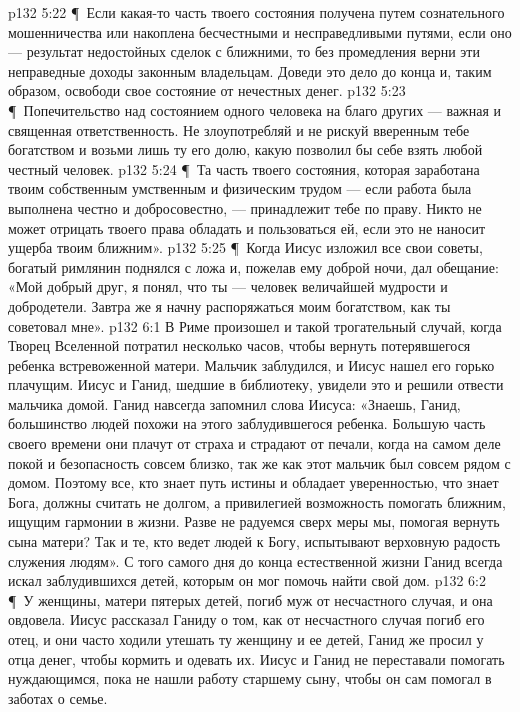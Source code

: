 \vs p132 5:22 \P\ \bibnobreakspace Если какая\hyp{}то часть твоего состояния получена путем сознательного мошенничества или накоплена бесчестными и несправедливыми путями, если оно --- результат недостойных сделок с ближними, то без промедления верни эти неправедные доходы законным владельцам. Доведи это дело до конца и, таким образом, освободи свое состояние от нечестных денег.
\vs p132 5:23 \P\ \bibnobreakspace Попечительство над состоянием одного человека на благо других --- важная и священная ответственность. Не злоупотребляй и не рискуй вверенным тебе богатством и возьми лишь ту его долю, какую позволил бы себе взять любой честный человек.
\vs p132 5:24 \P\ \bibnobreakspace Та часть твоего состояния, которая заработана твоим собственным умственным и физическим трудом --- если работа была выполнена честно и добросовестно, --- принадлежит тебе по праву. Никто не может отрицать твоего права обладать и пользоваться ей, если это не наносит ущерба твоим ближним».
\vs p132 5:25 \P\ Когда Иисус изложил все свои советы, богатый римлянин поднялся с ложа и, пожелав ему доброй ночи, дал обещание: «Мой добрый друг, я понял, что ты --- человек величайшей мудрости и добродетели. Завтра же я начну распоряжаться моим богатством, как ты советовал мне».
\vs p132 6:1 В Риме произошел и такой трогательный случай, когда Творец Вселенной потратил несколько часов, чтобы вернуть потерявшегося ребенка встревоженной матери. Мальчик заблудился, и Иисус нашел его горько плачущим. Иисус и Ганид, шедшие в библиотеку, увидели это и решили отвести мальчика домой. Ганид навсегда запомнил слова Иисуса: «Знаешь, Ганид, большинство людей похожи на этого заблудившегося ребенка. Большую часть своего времени они плачут от страха и страдают от печали, когда на самом деле покой и безопасность совсем близко, так же как этот мальчик был совсем рядом с домом. Поэтому все, кто знает путь истины и обладает уверенностью, что знает Бога, должны считать не долгом, а привилегией возможность помогать ближним, ищущим гармонии в жизни. Разве не радуемся сверх меры мы, помогая вернуть сына матери? Так и те, кто ведет людей к Богу, испытывают верховную радость служения людям». С того самого дня до конца естественной жизни Ганид всегда искал заблудившихся детей, которым он мог помочь найти свой дом.
\vs p132 6:2 \P\ У женщины, матери пятерых детей, погиб муж от несчастного случая, и она овдовела. Иисус рассказал Ганиду о том, как от несчастного случая погиб его отец, и они часто ходили утешать ту женщину и ее детей, Ганид же просил у отца денег, чтобы кормить и одевать их. Иисус и Ганид не переставали помогать нуждающимся, пока не нашли работу старшему сыну, чтобы он сам помогал в заботах о семье.
